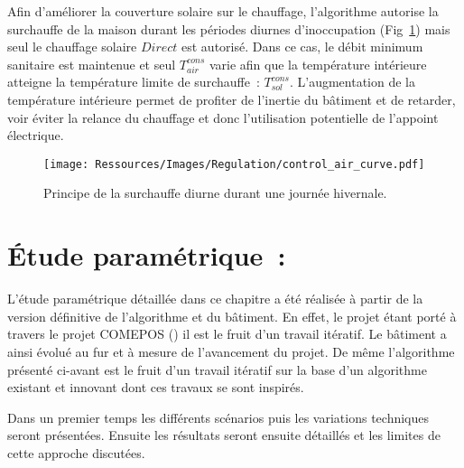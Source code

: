 Afin d’améliorer la couverture solaire sur le chauffage, l’algorithme autorise la
surchauffe de la maison durant les périodes diurnes d’inoccupation
(Fig~\ref{fig:control_air}) mais seul le chauffage solaire $Direct$ est autorisé. Dans ce
cas, le débit minimum sanitaire est maintenue et seul $T_{air}^{cons}$ varie afin que la
température intérieure atteigne la température limite de surchauffe~:
$T^{cons}_{sol}$. L’augmentation de la température intérieure permet de profiter de
l’inertie du bâtiment et de retarder, voir éviter la relance du chauffage et donc
l’utilisation potentielle de l’appoint électrique.
\begin{figure}
    \begin{center}
        \texttt{[image: Ressources/Images/Regulation/control\_air\_curve.pdf]}
    \end{center}
    \caption{Principe de la surchauffe diurne durant une journée hivernale.
             \label{fig:control_air}}
\end{figure}








\section{Étude paramétrique~:} %
\label{sec:etude_parametrique_}
L’étude paramétrique détaillée dans ce chapitre a été réalisée à partir de la
version définitive de l’algorithme et du bâtiment. En effet, le projet étant
porté à travers le projet COMEPOS ()
il est le fruit d’un travail itératif. Le bâtiment a ainsi évolué au fur et à mesure
de l’avancement du projet. De même l’algorithme présenté ci-avant est le fruit d’un
travail itératif sur la base d’un algorithme existant et innovant dont
ces travaux se sont inspirés.

Dans un premier temps les différents scénarios puis les variations techniques
seront présentées. Ensuite les résultats seront ensuite détaillés et les limites
de cette approche discutées.


